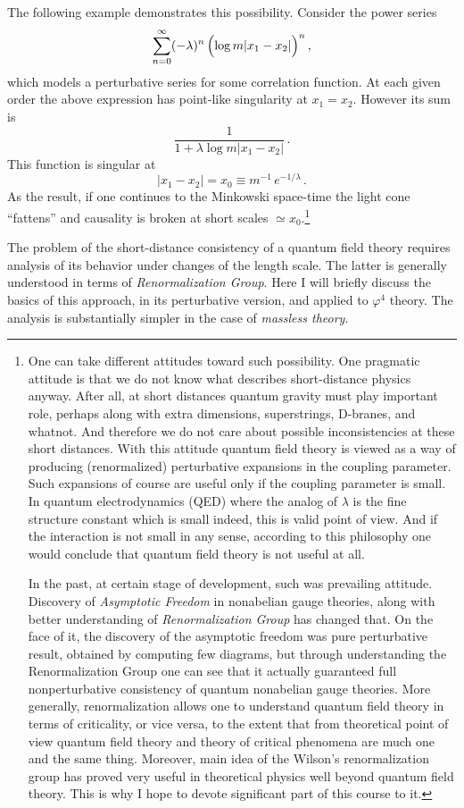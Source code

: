 The following example demonstrates this possibility. Consider the power series
\[
\sum_{n=0}^\infty(-\lambda)^n\,\Bigl(\log m|x_1-x_2|\Bigr)^n\,,
\]
which models a perturbative series for some correlation function. At each given
order the above expression has point-like singularity at $x_1=x_2$. However its
sum is
\[
\frac1{1+\lambda\log m|x_1-x_2|}\,.
\]
This function is singular at
\[
|x_1-x_2|=x_0\equiv m^{-1}\,e^{-1/\lambda}\,.
\]
As the result, if one continues to the Minkowski space-time the light cone
``fattens'' and causality is broken at short scales $\simeq x_0$.\footnote{One
can take different attitudes toward such possibility. One pragmatic attitude is
that we do not know what describes short-distance physics anyway. After all, at
short distances quantum gravity must play important role, perhaps along with
extra dimensions, superstrings, D-branes, and whatnot. And therefore we do not
care about possible inconsistencies at these short distances. With this attitude
quantum field theory is viewed as a way of producing (renormalized) perturbative
expansions in the coupling parameter. Such expansions of course are useful only
if the coupling parameter is small. In quantum electrodynamics (QED) where the
analog of $\lambda$ is the fine structure constant which is small indeed, this is
valid point of view. And if the interaction is not small in any sense, according
to this philosophy one would conclude that quantum field theory is not useful at
all.\par
In the past, at certain stage of development, such was prevailing attitude.
Discovery of \emph{Asymptotic Freedom} in nonabelian gauge theories, along with
better understanding of \emph{Renormalization Group} has changed that. On the
face of it, the discovery of the asymptotic freedom was pure perturbative result,
obtained by computing few diagrams, but through understanding the Renormalization
Group one can see that it actually guaranteed full nonperturbative consistency of
quantum nonabelian gauge theories. More generally, renormalization allows one to
understand quantum field theory in terms of criticality, or vice versa, to the
extent that from theoretical point of view quantum field theory and theory of
critical phenomena are much one and the same thing. Moreover, main idea of the
Wilson's renormalization group has proved very useful in theoretical physics well
beyond quantum field theory. This is why I hope to devote significant part of this
course to it.}

The problem of the short-distance consistency of a quantum field theory requires
analysis of its behavior under changes of the length scale. The latter is
generally understood in terms of \emph{Renormalization Group}. Here I will
briefly discuss the basics of this approach, in its perturbative version, and
applied to $\varphi^4$ theory. The analysis is substantially simpler in the case
of \emph{massless theory}.


